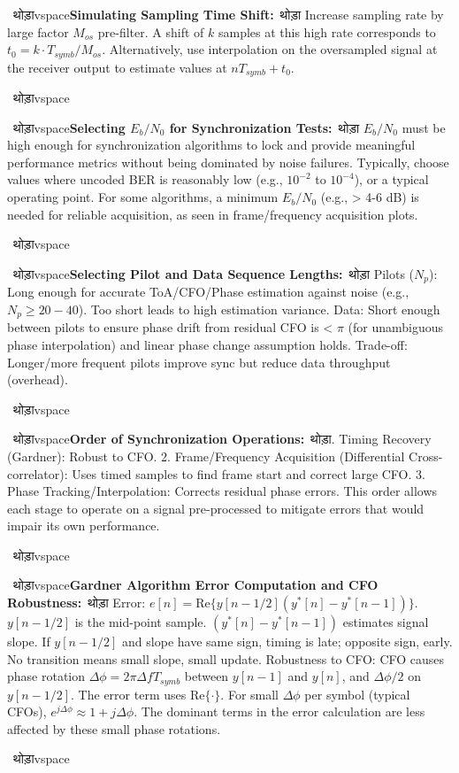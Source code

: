 \documentclass[11pt]{article}
\newenvironment{projectquestion}[1]
{\par\ थोड़ाvspace{\topsep}\noindent\textbf{#1}\ थोड़ा\quad\ignorespaces}
{\par\ थोड़ाvspace{\topsep}}
\begin{document}
			\begin{projectquestion}{Simulating Sampling Time Shift:}
				Increase sampling rate by large factor $M_{os}$ pre-filter. A shift of $k$ samples at this high rate corresponds to $t_0 = k \cdot T_{symb}/M_{os}$. Alternatively, use interpolation on the oversampled signal at the receiver output to estimate values at $nT_{symb} + t_0$.
			\end{projectquestion}
			
			\begin{projectquestion}{Selecting $E_b/N_0$ for Synchronization Tests:}
				$E_b/N_0$ must be high enough for synchronization algorithms to lock and provide meaningful performance metrics without being dominated by noise failures. Typically, choose values where uncoded BER is reasonably low (e.g., $10^{-2}$ to $10^{-4}$), or a typical operating point. For some algorithms, a minimum $E_b/N_0$ (e.g., > 4-6 dB) is needed for reliable acquisition, as seen in frame/frequency acquisition plots.
			\end{projectquestion}
			
			\begin{projectquestion}{Selecting Pilot and Data Sequence Lengths:}
				Pilots ($N_p$): Long enough for accurate ToA/CFO/Phase estimation against noise (e.g., $N_p \ge 20-40$). Too short leads to high estimation variance.
				Data: Short enough between pilots to ensure phase drift from residual CFO is < $\pi$ (for unambiguous phase interpolation) and linear phase change assumption holds.
				Trade-off: Longer/more frequent pilots improve sync but reduce data throughput (overhead).
			\end{projectquestion}
			
			\begin{projectquestion}{Order of Synchronization Operations:}
				1. Timing Recovery (Gardner): Robust to CFO.
				2. Frame/Frequency Acquisition (Differential Cross-correlator): Uses timed samples to find frame start and correct large CFO.
				3. Phase Tracking/Interpolation: Corrects residual phase errors.
				This order allows each stage to operate on a signal pre-processed to mitigate errors that would impair its own performance.
			\end{projectquestion}
			
			\begin{projectquestion}{Gardner Algorithm Error Computation and CFO Robustness:}
				Error: $e[n] = \text{Re} \{ y[n-1/2] ( y^{*}[n] - y^{*}[n-1] ) \}$. $y[n-1/2]$ is the mid-point sample. $(y^{*}[n] - y^{*}[n-1])$ estimates signal slope. If $y[n-1/2]$ and slope have same sign, timing is late; opposite sign, early. No transition means small slope, small update.
				Robustness to CFO: CFO causes phase rotation $\Delta\phi = 2\pi \Delta f T_{symb}$ between $y[n-1]$ and $y[n]$, and $\Delta\phi/2$ on $y[n-1/2]$. The error term uses $\text{Re}\{\cdot\}$. For small $\Delta\phi$ per symbol (typical CFOs), $e^{j\Delta\phi} \approx 1+j\Delta\phi$. The dominant terms in the error calculation are less affected by these small phase rotations.
			\end{projectquestion}
			
\end{document}
